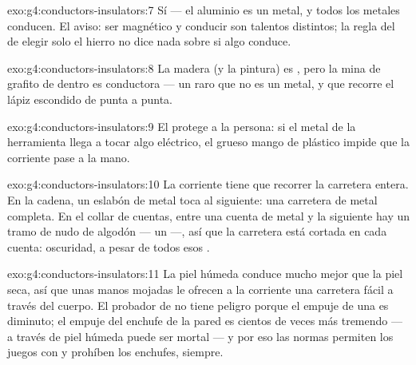 \begin{solution}{exo:g4:conductors-insulators:7}
Sí --- el aluminio es un metal, y todos los metales conducen. El
aviso: ser magnético y conducir son talentos distintos; la regla del
 de elegir solo el hierro no dice nada sobre si algo conduce.
\end{solution}

\begin{solution}{exo:g4:conductors-insulators:8}
La madera (y la pintura) es , pero la mina de grafito de
dentro es conductora --- un raro  que no es un metal, y
que recorre el lápiz escondido de punta a punta.
\end{solution}

\begin{solution}{exo:g4:conductors-insulators:9}
El  protege a la persona: si el metal de la herramienta
llega a tocar algo eléctrico, el grueso mango de plástico impide que
la corriente pase a la mano.
\end{solution}

\begin{solution}{exo:g4:conductors-insulators:10}
La corriente tiene que recorrer la carretera entera. En la cadena, un
eslabón de metal toca al siguiente: una carretera de metal completa.
En el collar de cuentas, entre una cuenta de metal y la siguiente hay
un tramo de nudo de algodón --- un  ---, así que la
carretera está cortada en cada cuenta: oscuridad, a pesar de todos
esos .
\end{solution}

\begin{solution}{exo:g4:conductors-insulators:11}
La piel húmeda conduce mucho mejor que la piel seca, así que unas
manos mojadas le ofrecen a la corriente una carretera fácil a través
del cuerpo. El probador de  no tiene peligro porque el empuje de
una  es diminuto; el empuje del enchufe de la pared es cientos
de veces más tremendo --- a través de piel húmeda puede ser mortal ---
y por eso las normas permiten los juegos con  y prohíben los
enchufes, siempre.
\end{solution}
